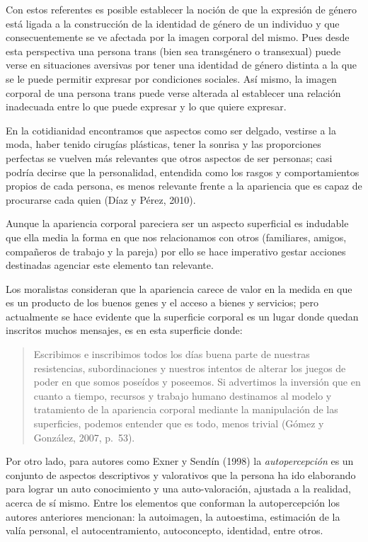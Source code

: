 Con estos referentes es posible establecer la noción de que la expresión de
género está ligada a la construcción de la identidad de género de un individuo y
que consecuentemente se ve afectada por la imagen corporal del mismo.
Pues desde esta perspectiva una persona trans (bien sea transgénero o
transexual) puede verse en situaciones aversivas por tener una identidad de
género distinta a la que se le puede permitir expresar por condiciones sociales.
Así mismo, la imagen corporal de una persona trans puede verse alterada al
establecer una relación inadecuada entre lo que puede expresar y lo que quiere
expresar.

En la cotidianidad encontramos que aspectos como ser delgado, vestirse a la
moda, haber tenido cirugías plásticas, tener la sonrisa y las proporciones
perfectas se vuelven más relevantes que otros aspectos de ser personas;
casi podría decirse que la personalidad, entendida como los rasgos y
comportamientos propios de cada persona, es menos relevante frente a la
apariencia que es capaz de procurarse cada quien (Díaz y Pérez, 2010).

Aunque la apariencia corporal pareciera ser un aspecto superficial es indudable
que ella media la forma en que nos relacionamos con otros (familiares, amigos,
compañeros de trabajo y la pareja) por ello se hace imperativo gestar acciones
destinadas agenciar este elemento tan relevante.

Los moralistas consideran que la apariencia carece de valor en la medida en que
es un producto de los buenos genes y el acceso a bienes y servicios;
pero actualmente se hace evidente que la superficie corporal es un lugar
donde quedan inscritos muchos mensajes, es en esta superficie donde:

\begin{quote}
Escribimos e inscribimos todos los días buena parte de nuestras
resistencias, subordinaciones y nuestros intentos de alterar los juegos de
poder en que somos poseídos y poseemos.
Si advertimos la inversión que en cuanto a tiempo, recursos y trabajo humano
destinamos al modelo y tratamiento de la apariencia corporal mediante la
manipulación de las superficies, podemos entender que es todo, menos trivial
(Gómez y González, 2007, p.~53).
\end{quote}

Por otro lado, para autores como Exner y Sendín (1998) la \emph{autopercepción}
es un
conjunto de aspectos descriptivos y valorativos que la persona ha ido elaborando
para lograr un auto conocimiento y una auto-valoración, ajustada a la realidad,
acerca de sí mismo.
Entre los elementos que conforman la autopercepción los autores
anteriores mencionan: la autoimagen, la autoestima, estimación de la valía
personal, el autocentramiento, autoconcepto, identidad, entre otros.

